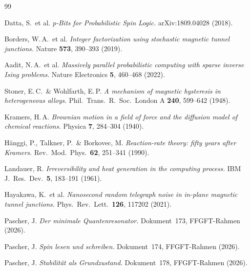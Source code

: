 	\newpage
	\begin{thebibliography}{99}
		
		Datta, S.\ et al.
		\textit{p-Bits for Probabilistic Spin Logic.}
		arXiv:1809.04028 (2018).
		
		Borders, W.\,A.\ et al.
		\textit{Integer factorization using stochastic magnetic tunnel junctions.}
		Nature \textbf{573}, 390--393 (2019).
		
		Aadit, N.\,A.\ et al.
		\textit{Massively parallel probabilistic computing with sparse inverse
			Ising problems.}
		Nature Electronics \textbf{5}, 460--468 (2022).
		
		Stoner, E.\,C.\ \& Wohlfarth, E.\,P.
		\textit{A mechanism of magnetic hysteresis in heterogeneous alloys.}
		Phil.\ Trans.\ R.\ Soc.\ London A \textbf{240}, 599--642 (1948).
		
		Kramers, H.\,A.
		\textit{Brownian motion in a field of force and the diffusion model
			of chemical reactions.}
		Physica \textbf{7}, 284--304 (1940).
		
		Hänggi, P., Talkner, P.\ \& Borkovec, M.
		\textit{Reaction-rate theory: fifty years after Kramers.}
		Rev.\ Mod.\ Phys.\ \textbf{62}, 251--341 (1990).
		
		Landauer, R.
		\textit{Irreversibility and heat generation in the computing process.}
		IBM J.\ Res.\ Dev.\ \textbf{5}, 183--191 (1961).
		
		Hayakawa, K.\ et al.
		\textit{Nanosecond random telegraph noise in in-plane magnetic
			tunnel junctions.}
		Phys.\ Rev.\ Lett.\ \textbf{126}, 117202 (2021).
		
		Pascher, J.
		\textit{Der minimale Quantenresonator.}
		Dokument~173, FFGFT-Rahmen (2026).
		
		Pascher, J.
		\textit{Spin lesen und schreiben.}
		Dokument~174, FFGFT-Rahmen (2026).
		
		Pascher, J.
		\textit{Stabilität als Grundzustand.}
		Dokument~178, FFGFT-Rahmen (2026).
		
	\end{thebibliography}
	
